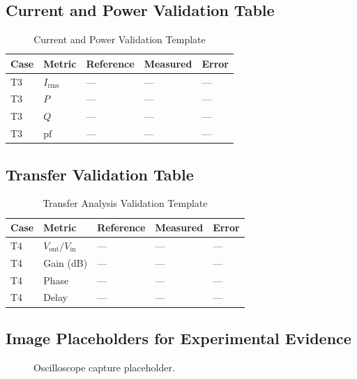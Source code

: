 \documentclass[conference]{IEEEtran}
\begin{document}
\subsection{Current and Power Validation Table}
\begin{table}[ht]
\caption{Current and Power Validation Template}
\label{tab:current-power-validation}
\centering
\begin{tabularx}{\columnwidth}{>{\raggedright\arraybackslash}p{} >{\raggedright\arraybackslash}p{} >{\raggedright\arraybackslash}p{} >{\raggedright\arraybackslash}p{} X}
\toprule
\textbf{Case} & \textbf{Metric} & \textbf{Reference} & \textbf{Measured} & \textbf{Error} \\
\midrule
T3 & $I_{\mathrm{rms}}$ & --- & --- & --- \\
T3 & $P$ & --- & --- & --- \\
T3 & $Q$ & --- & --- & --- \\
T3 & $\mathrm{pf}$ & --- & --- & --- \\
\bottomrule
\end{tabularx}
\end{table}

\subsection{Transfer Validation Table}
\begin{table}[ht]
\caption{Transfer Analysis Validation Template}
\label{tab:transfer-validation}
\centering
\begin{tabularx}{\columnwidth}{>{\raggedright\arraybackslash}p{} >{\raggedright\arraybackslash}p{} >{\raggedright\arraybackslash}p{} >{\raggedright\arraybackslash}p{} X}
\toprule
\textbf{Case} & \textbf{Metric} & \textbf{Reference} & \textbf{Measured} & \textbf{Error} \\
\midrule
T4 & $V_{\mathrm{out}}/V_{\mathrm{in}}$ & --- & --- & --- \\
T4 & Gain (dB) & --- & --- & --- \\
T4 & Phase & --- & --- & --- \\
T4 & Delay & --- & --- & --- \\
\bottomrule
\end{tabularx}
\end{table}

\subsection{Image Placeholders for Experimental Evidence}
\begin{figure}[ht]
\centering
{}
\caption{Oscilloscope capture placeholder.}
\label{fig:test-scope-placeholder}
\end{figure}
\end{document}
